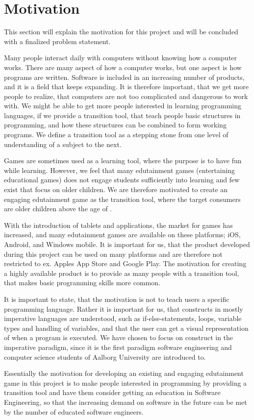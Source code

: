 \section{Motivation}
\label{sec:motivation}

This section will explain the motivation for this project and will be concluded with a finalized problem statement.


Many people interact daily with computers without knowing how a computer works. There are many aspect of how a computer works, but one aspect is how programs are written.
Software is included in an increasing number of products, and it is a field that keeps expanding.
It is therefore important, that we get more people to realize, that computers are not too complicated and dangerous to work with.
We might be able to get more people interested in learning programming languages, if we provide a transition tool, that teach people basic structures in programming, and how these structures can be combined to form working programs. We define a transition tool as a stepping stone from one level of understanding of a subject to the next. 


Games are sometimes used as a learning tool, where the purpose is to have fun while learning.
However, we feel that many edutainment games (entertaining educational games) does not engage students sufficiently into learning and few exist that focus on older children. 
We are therefore motivated to create an engaging edutainment game as the transition tool, where the target consumers are older children above the age of . 


With the introduction of tablets and applications, the market for games has increased, and many edutainment games are available on these platforms; iOS, Android, and Windows mobile.
It is important for us, that the product developed during this project can be used on many platforms and are therefore not restricted to ex. Apples App Store and Google Play.
The motivation for creating a highly available product is to provide as many people with a transition tool, that makes basic programming skills more common.


It is important to state, that the motivation is not to teach users a specific programming language.
Rather it is important for us, that constructs in mostly imperative languages are understood, such as if-else-statements, loops, variable types and handling of variables, and that the user can get a visual representation of when a program is executed. We have chosen to focus on construct in the imperative paradigm, since it is the first paradigm software engineering and computer science students of Aalborg University are introduced to.


Essentially the motivation for developing an existing and engaging edutainment game in this project is to make people interested in programming by providing a transition tool and have them consider getting an education in Software Engineering, so that the increasing demand on software in the future can be met by the number of educated software engineers.\citep{idaArtikelMangel}